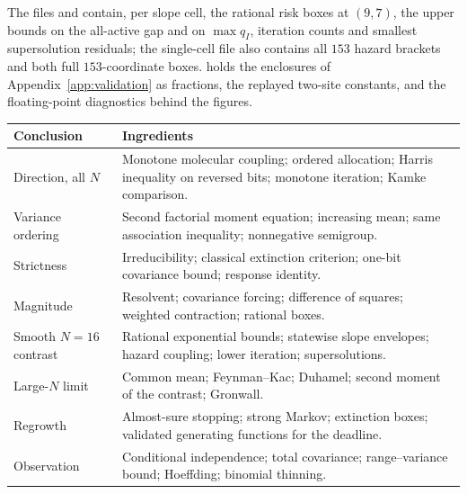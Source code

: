 \documentclass[11pt]{article}
\theoremstyle{remark}
\begin{document}
The files  and
 contain, per slope cell, the rational
risk boxes at $(9,7)$, the upper bounds on the all-active gap and on
$\max q_I$, iteration counts and smallest supersolution residuals; the
single-cell file also contains all $153$ hazard brackets and both full
$153$-coordinate boxes.  holds the
enclosures of Appendix~\ref{app:validation} as fractions,
 the replayed two-site constants, and
 the floating-point diagnostics behind the
figures.
\begin{center}\small
\begin{tabular}{p{.27\linewidth}p{.65\linewidth}}
\toprule
Conclusion & Ingredients\\\midrule
Direction, all $N$ & Monotone molecular coupling; ordered allocation; Harris inequality on reversed bits; monotone iteration; Kamke comparison.\\
Variance ordering & Second factorial moment equation; increasing mean; same association inequality; nonnegative semigroup.\\
Strictness & Irreducibility; classical extinction criterion; one-bit covariance bound; response identity.\\
Magnitude & Resolvent; covariance forcing; difference of squares; weighted contraction; rational boxes.\\
Smooth $N=16$ contrast & Rational exponential bounds; statewise slope envelopes; hazard coupling; lower iteration; supersolutions.\\
Large-$N$ limit & Common mean; Feynman--Kac; Duhamel; second moment of the contrast; Gronwall.\\
Regrowth & Almost-sure stopping; strong Markov; extinction boxes; validated generating functions for the deadline.\\
Observation & Conditional independence; total covariance; range--variance bound; Hoeffding; binomial thinning.\\\bottomrule
\end{tabular}
\end{center}



\end{document}

